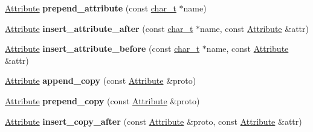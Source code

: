 \begin{DoxyCompactItemize}
\item 
\hypertarget{classphys_1_1xml_1_1Node_abc20afab0e50b0d9c578a02e91608226}{
\hyperlink{classphys_1_1xml_1_1Attribute}{Attribute} {\bfseries prepend\_\-attribute} (const \hyperlink{namespacephys_1_1xml_afc87705cd1c2917d87b879715a2d8f6e}{char\_\-t} $\ast$name)}
\label{d7/d0a/classphys_1_1xml_1_1Node_abc20afab0e50b0d9c578a02e91608226}

\item 
\hypertarget{classphys_1_1xml_1_1Node_aae7d7e21d419c9f95549d14ddccb1334}{
\hyperlink{classphys_1_1xml_1_1Attribute}{Attribute} {\bfseries insert\_\-attribute\_\-after} (const \hyperlink{namespacephys_1_1xml_afc87705cd1c2917d87b879715a2d8f6e}{char\_\-t} $\ast$name, const \hyperlink{classphys_1_1xml_1_1Attribute}{Attribute} \&attr)}
\label{d7/d0a/classphys_1_1xml_1_1Node_aae7d7e21d419c9f95549d14ddccb1334}

\item 
\hypertarget{classphys_1_1xml_1_1Node_a0b22783a8ce773f7b3847d7f2ec9b475}{
\hyperlink{classphys_1_1xml_1_1Attribute}{Attribute} {\bfseries insert\_\-attribute\_\-before} (const \hyperlink{namespacephys_1_1xml_afc87705cd1c2917d87b879715a2d8f6e}{char\_\-t} $\ast$name, const \hyperlink{classphys_1_1xml_1_1Attribute}{Attribute} \&attr)}
\label{d7/d0a/classphys_1_1xml_1_1Node_a0b22783a8ce773f7b3847d7f2ec9b475}

\item 
\hypertarget{classphys_1_1xml_1_1Node_a8067d9c5861a4dc89c644eded1987b7d}{
\hyperlink{classphys_1_1xml_1_1Attribute}{Attribute} {\bfseries append\_\-copy} (const \hyperlink{classphys_1_1xml_1_1Attribute}{Attribute} \&proto)}
\label{d7/d0a/classphys_1_1xml_1_1Node_a8067d9c5861a4dc89c644eded1987b7d}

\item 
\hypertarget{classphys_1_1xml_1_1Node_a875eb8b249394050178e26d978a247cf}{
\hyperlink{classphys_1_1xml_1_1Attribute}{Attribute} {\bfseries prepend\_\-copy} (const \hyperlink{classphys_1_1xml_1_1Attribute}{Attribute} \&proto)}
\label{d7/d0a/classphys_1_1xml_1_1Node_a875eb8b249394050178e26d978a247cf}

\item 
\hypertarget{classphys_1_1xml_1_1Node_a0d12c7f719d26042afb83b8045babbf0}{
\hyperlink{classphys_1_1xml_1_1Attribute}{Attribute} {\bfseries insert\_\-copy\_\-after} (const \hyperlink{classphys_1_1xml_1_1Attribute}{Attribute} \&proto, const \hyperlink{classphys_1_1xml_1_1Attribute}{Attribute} \&attr)}
\label{d7/d0a/classphys_1_1xml_1_1Node_a0d12c7f719d26042afb83b8045babbf0}


\end{DoxyCompactItemize}
